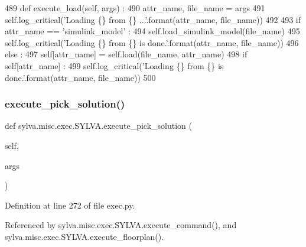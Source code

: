 \begin{DoxyCode}
489   \textcolor{keyword}{def }execute\_load(self, args) :
490     attr\_name, file\_name = args
491     self.log\_critical(\textcolor{stringliteral}{'Loading \{\} from \{\} ...'}.format(attr\_name, file\_name))
492 
493     \textcolor{keywordflow}{if} attr\_name == \textcolor{stringliteral}{'simulink\_model'} :
494       self.load\_simulink\_model(file\_name)
495       self.log\_critical(\textcolor{stringliteral}{'Loading \{\} from \{\} is done.'}.format(attr\_name, file\_name))
496     \textcolor{keywordflow}{else} :
497       self[attr\_name] = self.load(file\_name, attr\_name)
498       \textcolor{keywordflow}{if} self[attr\_name] :
499         self.log\_critical(\textcolor{stringliteral}{'Loading \{\} from \{\} is done.'}.format(attr\_name, file\_name))
500 
\end{DoxyCode}
\mbox{\label{classsylva_1_1misc_1_1exec_1_1_s_y_l_v_a_a06ccbb90cddd35e6f7c037bbc5148e93}} 
\subsubsection{\texorpdfstring{execute\+\_\+pick\+\_\+solution()}{execute\_pick\_solution()}}
{\footnotesize\ttfamily def sylva.\+misc.\+exec.\+S\+Y\+L\+V\+A.\+execute\+\_\+pick\+\_\+solution (\begin{DoxyParamCaption}\item[{}]{self,  }\item[{}]{args }\end{DoxyParamCaption})}



Definition at line 272 of file exec.\+py.



Referenced by sylva.\+misc.\+exec.\+S\+Y\+L\+V\+A.\+execute\+\_\+command(), and sylva.\+misc.\+exec.\+S\+Y\+L\+V\+A.\+execute\+\_\+floorplan().


